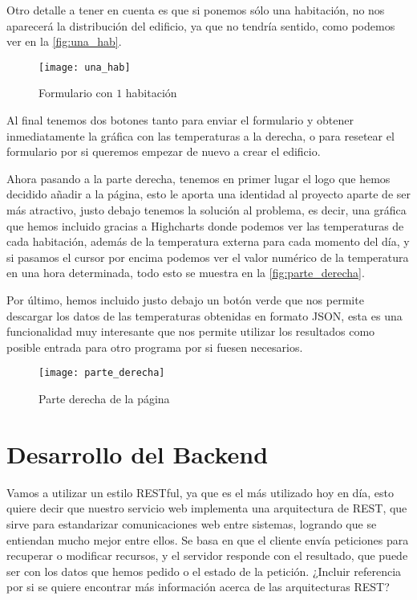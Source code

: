 Otro detalle a tener en cuenta es que si ponemos sólo una habitación, no nos aparecerá la distribución del edificio, ya que no tendría sentido, como podemos ver en la \autoref{fig:una_hab}.
\begin{figure}[h!]
	\centering
	\texttt{[image: una\_hab]}
	\caption{Formulario con $1$ habitación}
	\label{fig:una_hab}
\end{figure}
Al final tenemos dos botones tanto para enviar el formulario y obtener inmediatamente la gráfica con las temperaturas a la derecha, o para resetear el formulario por si queremos empezar de nuevo a crear el edificio.

Ahora pasando a la parte derecha, tenemos en primer lugar el logo que hemos decidido añadir a la página, esto le aporta una identidad al proyecto aparte de ser más atractivo, justo debajo tenemos la solución al problema, es decir, una gráfica que hemos incluido gracias a Highcharts donde podemos ver las temperaturas de cada habitación, además de la temperatura externa para cada momento del día, y si pasamos el cursor por encima podemos ver el valor numérico de la temperatura en una hora determinada, todo esto se muestra en la \autoref{fig:parte_derecha}.

Por último, hemos incluido justo debajo un botón verde que nos permite descargar los datos de las temperaturas obtenidas en formato JSON, esta es una funcionalidad muy interesante que nos permite utilizar los resultados como posible entrada para otro programa por si fuesen necesarios.
\begin{figure}[h!]
	\centering
	\texttt{[image: parte\_derecha]}
	\caption{Parte derecha de la página}
	\label{fig:parte_derecha}
\end{figure}
\section{Desarrollo del Backend}
Vamos a utilizar un estilo RESTful, ya que es el más utilizado hoy en día, esto quiere decir que nuestro servicio web implementa una arquitectura de REST, que sirve para estandarizar comunicaciones web entre sistemas, logrando que se entiendan mucho mejor entre ellos. Se basa en que el cliente envía peticiones para recuperar o modificar recursos, y el servidor responde con el resultado, que puede ser con los datos que hemos pedido o el estado de la petición. ¿Incluir referencia por si se quiere encontrar más información acerca de las arquitecturas REST?

